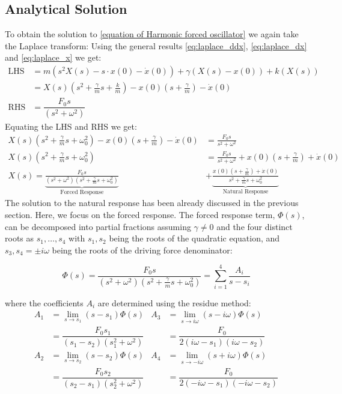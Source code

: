 \documentclass[10pt,twoside]{report}
\begin{document}
\subsection{Analytical Solution}
To obtain the solution to \eqref{equation of Harmonic forced oscillator} we again take the Laplace transform:
Using the general results \eqref{eq:laplace_ddx}, \eqref{eq:laplace_dx} and \eqref{eq:laplace_x} we get:
\begin{align*}
    \text{LHS} &=  m(s^2 X(s) - s \cdot x(0) - \dot{x}(0)) + \gamma(X(s) - x(0))+k(X(s))\\ 
               &= X(s) \left( s^2 + \frac{\gamma}{m} s + \frac{k}{m} \right) - x(0) \left( s + \frac{\gamma}{m} \right) - \dot{x}(0) \\[10pt]
    \text{RHS} &=\dfrac{F_0s}{(s^2+\omega^2)}
\end{align*}
Equating the LHS and RHS we get:
\begin{align*}
    X(s) \left( s^2 + \frac{\gamma}{m} s + \omega_0^2 \right) - x(0) \left( s + \frac{\gamma}{m} \right) - \dot{x}(0) &= \frac{F_0 s}{s^2 + \omega^2} \\[15pt]
    X(s) \left( s^2 + \frac{\gamma}{m} s + \omega_0^2 \right) &= \frac{F_0 s}{s^2 + \omega^2} + x(0) \left( s + \frac{\gamma}{m} \right) + \dot{x}(0) \\[15pt]
    X(s) = \underbrace{\frac{F_0 s}{(s^2 + \omega^2)\left( s^2 + \frac{\gamma}{m} s + \omega_0^2 \right)}}_{\text{Forced Response}} &+ \underbrace{\frac{x(0) \left( s + \frac{\gamma}{m} \right) + \dot{x}(0)}{s^2 + \frac{\gamma}{m} s + \omega_0^2}}_{\text{Natural Response}}
\end{align*}
The solution to the natural response has been already discussed in the previous section. Here, we focus on the forced response. The forced response term, $\Phi(s)$, can be decomposed into partial fractions assuming $\gamma \neq 0$ and the four distinct roots as $s_1, \dots, s_4$ with $s_1, s_2$ being the roots of the quadratic equation, and $s_3, s_4 = \pm i\omega$ being the roots of the driving force denominator:

\begin{equation*}
    \Phi(s) = \frac{F_0 s}{(s^2 + \omega^2)\left( s^2 + \frac{\gamma}{m} s + \omega_0^2 \right)} = \sum_{i=1}^{4} \frac{A_i}{s - s_i}
\end{equation*}

where the coefficients $A_i$ are determined using the residue method:
\begin{align*}
    A_1 &= \lim_{s \to s_1} (s - s_1) \Phi(s) & A_3 &= \lim_{s \to i\omega} (s - i\omega) \Phi(s) \\
        &= \dfrac{F_0 s_1}{(s_1 - s_2)(s_1^2 + \omega^2)} & &= \dfrac{F_0}{2(i\omega - s_1)(i\omega - s_2)} \\[12pt]
    A_2 &= \lim_{s \to s_2} (s - s_2) \Phi(s) & A_4 &= \lim_{s \to -i\omega} (s + i\omega) \Phi(s) \\
        &= \dfrac{F_0 s_2}{(s_2 - s_1)(s_2^2 + \omega^2)} & &= \dfrac{F_0}{2(-i\omega - s_1)(-i\omega - s_2)}
\end{align*}
\end{document}
